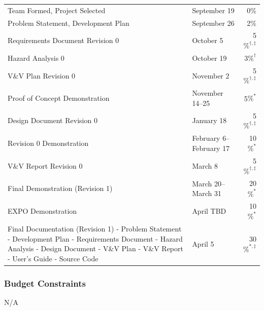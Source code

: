 \documentclass[12pt]{article}
\begin{document}
\noindent \begin{tabular}{ p{9.7cm} l r}
	
	Team Formed, Project Selected & September 19 & 0\% \\
	
	Problem Statement, Development Plan & September 26 &
	2\% \\
	
	Requirements Document Revision 0 & October 5 & 5$\%^{\dagger, \ddagger}$ \\
	
	Hazard Analysis 0 & October 19 & 3$\%^\dagger$ \\
	
	V\&V Plan Revision 0 & November 2 & 5$\%^{\dagger, \ddagger}$ \\
	
	Proof of Concept Demonstration & November 14--25 & 5$\%^*$ \\
	
	Design Document Revision 0 & January 18 & 5$\%^{\dagger, \ddagger}$ \\
	
	Revision 0 Demonstration & February 6--February 17 & 10$\%^*$\\
	
	V\&V Report Revision 0 & March 8 & 5$\%^{\dagger, \ddagger}$ \\
	
	Final Demonstration (Revision 1) & March 20--March 31 &  20$\%^*$ \\
	
	EXPO Demonstration & April TBD & 10$\%^*$ \\
	
	Final Documentation (Revision 1)\newline 
	- Problem Statement\newline
	- Development Plan\newline
	- Requirements Document\newline
	- Hazard Analysis\newline
	- Design Document\newline
	- V\&V Plan\newline
	- V\&V Report\newline
	- User's Guide\newline
	- Source Code\newline &  April 5 & 30$\%^{*, \ddagger}$\\
	
\end{tabular}
\subsubsection{Budget Constraints}
N/A
\end{document}
